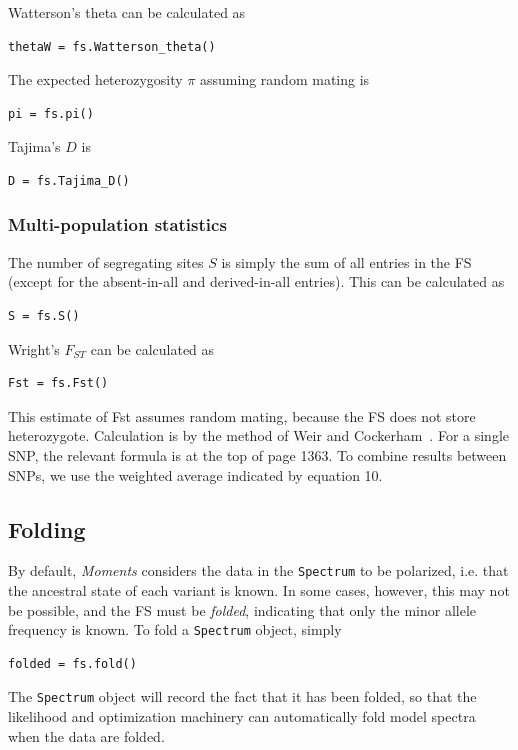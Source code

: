 \documentclass[12pt]{article}
\makeatletter
\newcommand{\py}[1]{\lstinline[breaklines=true,language=Python, showstringspaces=False]@#1@}
\makeatother
\begin{document}
Watterson's theta can be calculated as
\begin{lstlisting}
thetaW = fs.Watterson_theta()
\end{lstlisting}

The expected heterozygosity $\pi$ assuming random mating is
\begin{lstlisting}
pi = fs.pi()
\end{lstlisting}

Tajima's $D$ is
\begin{lstlisting}
D = fs.Tajima_D()
\end{lstlisting}

\subsubsection{Multi-population statistics}

The number of segregating sites $S$ is simply the sum of all entries in the FS (except for the absent-in-all and derived-in-all entries).
This can be calculated as
\begin{lstlisting}
S = fs.S()
\end{lstlisting}

Wright's $F_{ST}$ can be calculated as
\begin{lstlisting}
Fst = fs.Fst()
\end{lstlisting}
This estimate of Fst assumes random mating, because the FS does not store heterozygote.
Calculation is by the method of Weir and Cockerham~\cite{bib:Weir1984}.
For a single SNP, the relevant formula is at the top of page 1363.
To combine results between SNPs, we use the weighted average indicated by equation 10.

\subsection{Folding}

By default, \textit{Moments} considers the data in the \py{Spectrum} to be polarized, i.e. that the ancestral state of each variant is known.
In some cases, however, this may not be possible, and the FS must be \emph{folded}, indicating that only the minor allele frequency is known.
To fold a \py{Spectrum} object, simply
\begin{lstlisting}
folded = fs.fold()
\end{lstlisting}
The \py{Spectrum} object will record the fact that it has been folded, so that the likelihood and optimization machinery can automatically fold model spectra when the data are folded.
\end{document}
